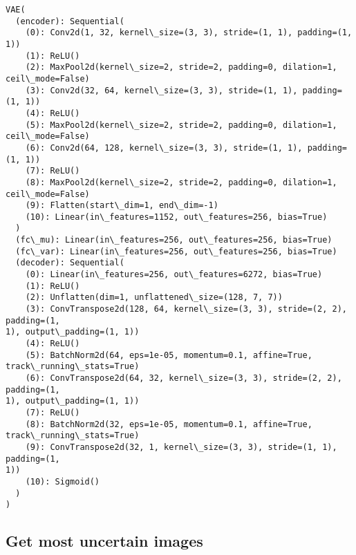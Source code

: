 \documentclass[11pt]{article}
\makeatletter
\newcommand{\boxspacing}{\kern\kvtcb@left@rule\kern\kvtcb@boxsep}
\newcommand{\prompt}[4]{
        {\ttfamily\llap{{\color{#2}[#3]:\hspace{3pt}#4}}\vspace{-\baselineskip}}
    }
\makeatother
\begin{document}
            \begin{tcolorbox}[breakable, size=fbox, boxrule=.5pt, pad at break*=1mm, opacityfill=0]
\prompt{Out}{outcolor}{ }{\boxspacing}
\begin{Verbatim}[commandchars=\\\{\}]
VAE(
  (encoder): Sequential(
    (0): Conv2d(1, 32, kernel\_size=(3, 3), stride=(1, 1), padding=(1, 1))
    (1): ReLU()
    (2): MaxPool2d(kernel\_size=2, stride=2, padding=0, dilation=1,
ceil\_mode=False)
    (3): Conv2d(32, 64, kernel\_size=(3, 3), stride=(1, 1), padding=(1, 1))
    (4): ReLU()
    (5): MaxPool2d(kernel\_size=2, stride=2, padding=0, dilation=1,
ceil\_mode=False)
    (6): Conv2d(64, 128, kernel\_size=(3, 3), stride=(1, 1), padding=(1, 1))
    (7): ReLU()
    (8): MaxPool2d(kernel\_size=2, stride=2, padding=0, dilation=1,
ceil\_mode=False)
    (9): Flatten(start\_dim=1, end\_dim=-1)
    (10): Linear(in\_features=1152, out\_features=256, bias=True)
  )
  (fc\_mu): Linear(in\_features=256, out\_features=256, bias=True)
  (fc\_var): Linear(in\_features=256, out\_features=256, bias=True)
  (decoder): Sequential(
    (0): Linear(in\_features=256, out\_features=6272, bias=True)
    (1): ReLU()
    (2): Unflatten(dim=1, unflattened\_size=(128, 7, 7))
    (3): ConvTranspose2d(128, 64, kernel\_size=(3, 3), stride=(2, 2), padding=(1,
1), output\_padding=(1, 1))
    (4): ReLU()
    (5): BatchNorm2d(64, eps=1e-05, momentum=0.1, affine=True,
track\_running\_stats=True)
    (6): ConvTranspose2d(64, 32, kernel\_size=(3, 3), stride=(2, 2), padding=(1,
1), output\_padding=(1, 1))
    (7): ReLU()
    (8): BatchNorm2d(32, eps=1e-05, momentum=0.1, affine=True,
track\_running\_stats=True)
    (9): ConvTranspose2d(32, 1, kernel\_size=(3, 3), stride=(1, 1), padding=(1,
1))
    (10): Sigmoid()
  )
)
\end{Verbatim}
\end{tcolorbox}
        
    \subsection{Get most uncertain images}\label{get-most-uncertain-images}
\end{document}
